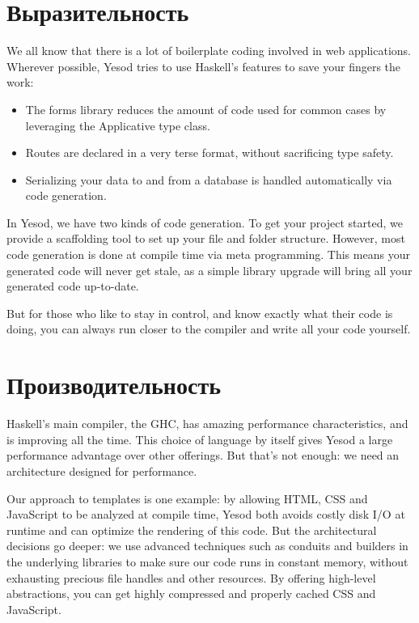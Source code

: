 \section{Выразительность}

We all know that there is a lot of boilerplate coding involved in web applications. Wherever possible, Yesod tries to use Haskell's features to save your fingers the work:

\begin{itemize}
  \item The forms library reduces the amount of code used for common cases by leveraging the Applicative type class.
  \item Routes are declared in a very terse format, without sacrificing type safety.
  \item Serializing your data to and from a database is handled automatically via code generation.
\end{itemize}

In Yesod, we have two kinds of code generation. To get your project started, we provide a scaffolding tool to set up your file and folder structure. However, most code generation is done at compile time via meta programming. This means your generated code will never get stale, as a simple library upgrade will bring all your generated code up-to-date.

But for those who like to stay in control, and know exactly what their code is doing, you can always run closer to the compiler and write all your code yourself.

\section{Производительность}

Haskell's main compiler, the GHC, has amazing performance characteristics, and is improving all the time. This choice of language by itself gives Yesod a large performance advantage over other offerings. But that's not enough: we need an architecture designed for performance.

Our approach to templates is one example: by allowing HTML, CSS and JavaScript to be analyzed at compile time, Yesod both avoids costly disk I/O at runtime and can optimize the rendering of this code. But the architectural decisions go deeper: we use advanced techniques such as conduits and builders in the underlying libraries to make sure our code runs in constant memory, without exhausting precious file handles and other resources. By offering high-level abstractions, you can get highly compressed and properly cached CSS and JavaScript.

